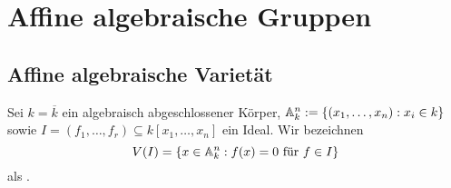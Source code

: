 \section{Affine algebraische Gruppen}
\label{sec:para1}
\subsection{Affine algebraische Varietät}
\label{sub:abschnitt_1.1}

\begin{defn}
	Sei $k = \overline{k}$ ein algebraisch abgeschlossener Körper, $\mathbb{A}_k^n := \{ (x_1,\dots,x_n) : x_i \in k\}$ sowie $I = (f_1,\dots,f_r) \subseteq k[x_1,\dots,x_n]$ ein Ideal. Wir bezeichnen
	\[ V(I) = \{x \in \mathbb{A}_k^n : f(x) = 0 \text{ für } f \in I\} \]
	als .
\end{defn}

